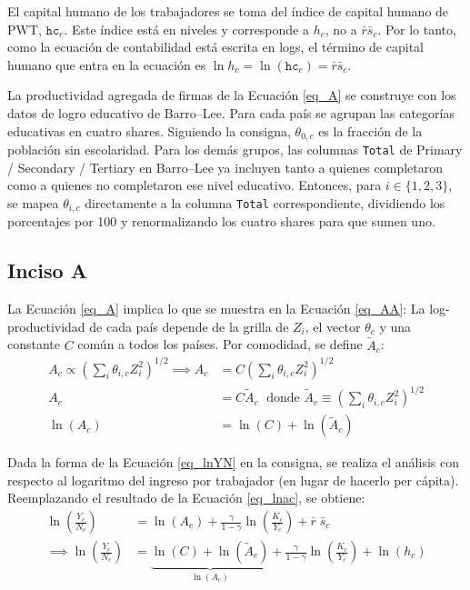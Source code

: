 El capital humano de los trabajadores se toma del índice de capital humano de PWT, $\texttt{hc}_c$. Este índice está en niveles y corresponde a $h_c$, no a $\bar r \bar s_c$. Por lo tanto, como la ecuación de contabilidad está escrita en logs, el término de capital humano que entra en la ecuación es $\ln h_c = \ln(\texttt{hc}_c) = \bar{r} \bar{s}_c$.

La productividad agregada de firmas de la Ecuación \ref{eq_A} se construye con los datos de logro educativo de Barro--Lee. Para cada país se agrupan las categorías educativas en cuatro shares. Siguiendo la consigna, $\theta_{0,c}$ es la fracción de la población sin escolaridad. Para los demás grupos, las columnas \texttt{Total} de Primary / Secondary / Tertiary en Barro--Lee ya incluyen tanto a quienes completaron como a quienes no completaron ese nivel educativo. Entonces, para $i \in \{1,2,3\}$, se mapea $\theta_{i,c}$ directamente a la columna \texttt{Total} correspondiente, dividiendo los porcentajes por 100 y renormalizando los cuatro shares para que sumen uno.

\subsection{Inciso A}

La Ecuación \ref{eq_A} implica lo que se muestra en la Ecuación \ref{eq_AA}: La log-productividad de cada país depende de la grilla de $Z_i$, el vector $\theta_c$ y una constante $C$ común a todos los países. Por comodidad, se define $\tilde{A}_c$:
\begin{align}
	A_c \propto \left(\sum_i \theta_{i,c} Z_i^2 \right)^{1/2}
	\implies 
	A_c &= C \left(\sum_i \theta_{i,c} Z_i^2 \right)^{1/2} \\
	A_c &= C \tilde{A}_c \; \text{ donde } \tilde{A}_c \equiv \left(\sum_i \theta_{i,c} Z_i^2 \right)^{1/2}
	\label{eq_AA} \\
	\ln( A_c ) &= \ln( C ) + \ln(\tilde{A}_c) \label{eq_lnac}
\end{align}

Dada la forma de la Ecuación \ref{eq_lnYN} en la consigna, se realiza el análisis con respecto al logaritmo del ingreso por trabajador (en lugar de hacerlo per cápita). Reemplazando el resultado de la Ecuación \ref{eq_lnac}, se obtiene:
\begin{align}
	\ln\left(\frac{Y_c}{N_c}\right) &= 
		  \ln(A_c) 
		+ \frac{\gamma}{1-\gamma} \ln\left(\frac{K_c}{Y_c}\right) 
		+ \bar{r} \; \bar{s}_c
		\label{eq_lnYN} \\
	\implies
	\ln\left(\frac{Y_c}{N_c}\right) &= 
	\underbrace{\ln( C ) + \ln(\tilde{A}_c) }_{\ln(A_c)}
	+ \frac{\gamma}{1-\gamma} \ln\left(\frac{K_c}{Y_c}\right) 
	+ \ln(h_c)
\end{align}

